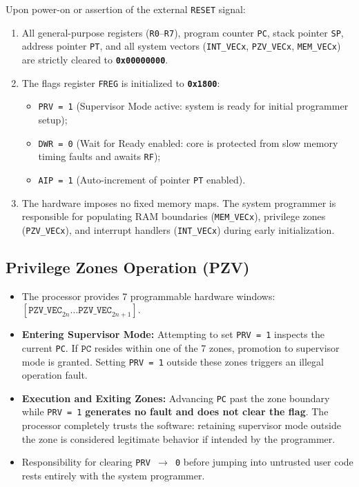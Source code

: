 \documentclass[11pt,a4paper]{article}
\begin{document}
\begin{archcallout}[title={Guaranteed Initial State After Reset (RESET)}]
Upon power-on or assertion of the external \texttt{RESET} signal:
\begin{enumerate}
    \item All general-purpose registers (\texttt{R0}--\texttt{R7}), program counter \texttt{PC}, stack pointer \texttt{SP}, address pointer \texttt{PT}, and all system vectors (\texttt{INT\_VECx}, \texttt{PZV\_VECx}, \texttt{MEM\_VECx}) are strictly cleared to \textbf{\texttt{0x00000000}}.
    \item The flags register \texttt{FREG} is initialized to \textbf{\texttt{0x1800}}:
    \begin{itemize}
        \item \texttt{PRV = 1} (Supervisor Mode active: system is ready for initial programmer setup);
        \item \texttt{DWR = 0} (Wait for Ready enabled: core is protected from slow memory timing faults and awaits \texttt{RF});
        \item \texttt{AIP = 1} (Auto-increment of pointer \texttt{PT} enabled).
    \end{itemize}
    \item The hardware imposes no fixed memory maps. The system programmer is responsible for populating RAM boundaries (\texttt{MEM\_VECx}), privilege zones (\texttt{PZV\_VECx}), and interrupt handlers (\texttt{INT\_VECx}) during early initialization.
\end{enumerate}
\end{archcallout}

\subsection{Privilege Zones Operation (PZV)}

\begin{securitycallout}[title={Hardware Rules for Privilege Zones (PZV)}]
\begin{itemize}
    \item The processor provides 7 programmable hardware windows: \([\texttt{PZV\_VEC}_{2n} \dots \texttt{PZV\_VEC}_{2n+1}]\).
    \item \textbf{Entering Supervisor Mode:} Attempting to set \texttt{PRV = 1} inspects the current \texttt{PC}. If \(\texttt{PC}\) resides within one of the 7 zones, promotion to supervisor mode is granted. Setting \texttt{PRV = 1} outside these zones triggers an illegal operation fault.
    \item \textbf{Execution and Exiting Zones:} Advancing \texttt{PC} past the zone boundary while \texttt{PRV = 1} \textbf{generates no fault and does not clear the flag}. The processor completely trusts the software: retaining supervisor mode outside the zone is considered legitimate behavior if intended by the programmer.
    \item Responsibility for clearing \texttt{PRV \(\to\) 0} before jumping into untrusted user code rests entirely with the system programmer.
\end{itemize}
\end{securitycallout}
\end{document}
